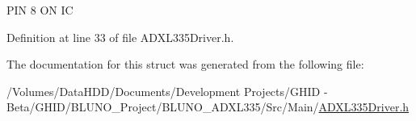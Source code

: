 \begin{DoxyItemize}
\item \-P\-I\-N 8 \-O\-N \-I\-C 
\end{DoxyItemize}

\-Definition at line 33 of file \-A\-D\-X\-L335\-Driver.\-h.



\-The documentation for this struct was generated from the following file\-:\begin{DoxyCompactItemize}
\item 
/\-Volumes/\-Data\-H\-D\-D/\-Documents/\-Development Projects/\-G\-H\-I\-D -\/ Beta/\-G\-H\-I\-D/\-B\-L\-U\-N\-O\-\_\-\-Project/\-B\-L\-U\-N\-O\-\_\-\-A\-D\-X\-L335/\-Src/\-Main/\hyperlink{_a_d_x_l335_driver_8h}{\-A\-D\-X\-L335\-Driver.\-h}\end{DoxyCompactItemize}
